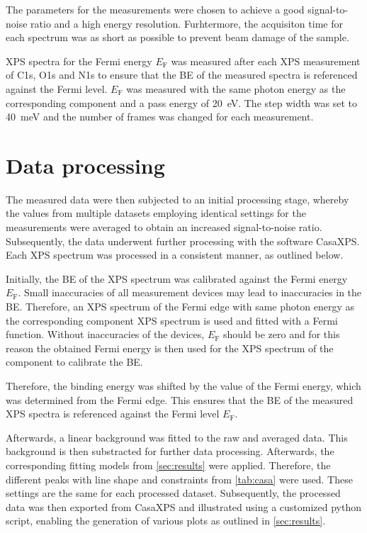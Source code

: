 The parameters for the measurements were chosen to achieve a good signal-to-noise ratio and a high energy resolution. Furhtermore, the acquisiton time for each spectrum was as short as possible to prevent beam damage of the sample. 

\ac{XPS} spectra for the Fermi energy $E_\mathrm{F}$ was measured after each \ac{XPS} measurement of C1s, O1s and N1s to ensure that the \ac{BE} of the measured spectra is referenced against the Fermi level. $E_\mathrm{F}$ was measured with the same photon energy as the corresponding component and a pass energy of 20~\si{\eV}. The step width was set to 40~\si{meV} and the number of frames was changed for each measurement.

\section{Data processing}

The measured data were then subjected to an initial processing stage, whereby the values from multiple datasets employing identical settings for the measurements were averaged to obtain an increased signal-to-noise ratio. Subsequently, the data underwent further processing with the software CasaXPS.\autocite{CasaSoftwareLtd2022} Each XPS spectrum was processed in a consistent manner, as outlined below.

Initially, the \ac{BE} of the \ac{XPS} spectrum was calibrated against the Fermi energy $E_\mathrm{F}$. Small inaccuracies of all measurement devices may lead to inaccuracies in the \ac{BE}. Therefore, an \ac{XPS} spectrum of the Fermi edge with same photon energy as the corresponding component \ac{XPS} spectrum is used and fitted with a Fermi function. Without inaccuracies of the devices, $E_\mathrm{F}$ should be zero and for this reason the obtained Fermi energy is then used for the \ac{XPS} spectrum of the component to calibrate the \ac{BE}.

Therefore, the binding energy was shifted by the value of the Fermi energy, which was determined from the Fermi edge. This ensures that the \ac{BE} of the measured \ac{XPS} spectra is referenced against the Fermi level $E_\mathrm{F}$.

Afterwards, a linear background was fitted to the raw and averaged data. This background is then substracted for further data processing. Afterwards, the corresponding fitting models from \autoref{sec:results} were applied. Therefore, the different peaks with line shape and constraints from \autoref{tab:casa} were used. These settings are the same for each processed dataset.
Subsequently, the processed data was then exported from CasaXPS and illustrated using a customized python script, enabling the generation of various plots as outlined in \autoref{sec:results}.


